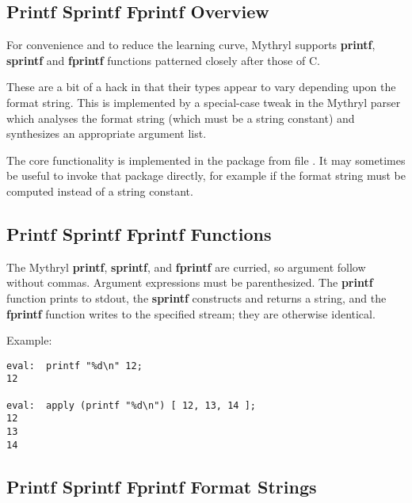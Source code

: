 \subsection{Printf Sprintf Fprintf Overview}
\label{section:libref:printf-sprintf-fprintf:overview}

For convenience and to reduce the learning curve, Mythryl supports 
{\bf printf}, {\bf sprintf} and {\bf fprintf} functions patterned 
closely after those of C.

These are a bit of a hack in that their types appear to vary depending 
upon the format string.  This is implemented by a special-case tweak in 
the Mythryl parser which analyses the format string (which must be a 
string constant) and synthesizes an appropriate argument list. 

The core functionality is implemented in the  package 
from file .  It may sometimes 
be useful to invoke that package directly, for example if the format string must be 
computed instead of a string constant.

\cutend*

\subsection{Printf Sprintf Fprintf Functions}
\label{section:libref:printf-sprintf-fprintf:functions}

The Mythryl {\bf printf}, {\bf sprintf}, and  {\bf fprintf} are curried, 
so argument follow without commas.  Argument expressions must be parenthesized. 
The {\bf printf} function prints to stdout, the {\bf sprintf} constructs and 
returns a string, and the {\bf fprintf} function writes to the specified stream; 
they are otherwise identical.


Example:
\begin{verbatim}
eval:  printf "%d\n" 12;
12

eval:  apply (printf "%d\n") [ 12, 13, 14 ];
12
13
14
\end{verbatim}

\cutend*

\subsection{Printf Sprintf Fprintf Format Strings}
\label{section:libref:printf-sprintf-fprintf:format-strings}

